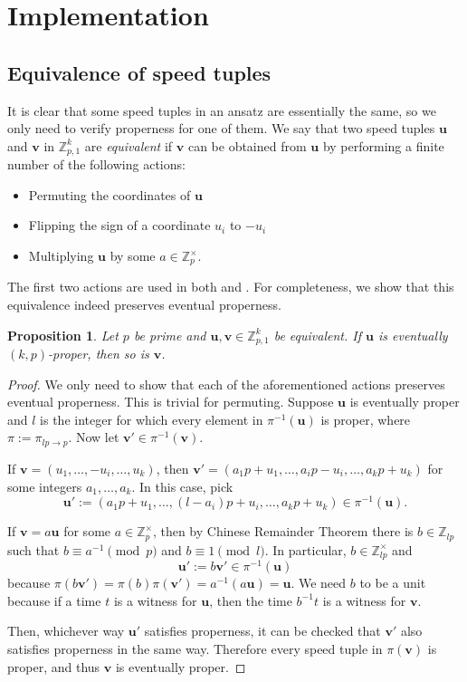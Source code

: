 \documentclass[11pt]{amsart}
\newcommand{\Unit}[1]{\Z_{#1}^\times}
\newcommand{\Z}{\mathbb{Z}}
\newcommand{\vbf}{\mathbf{v}}
\newcommand{\ubf}{\mathbf{u}}
\newtheorem{proposition}[theorem]{Proposition}
\theoremstyle{definition}
\theoremstyle{remark}
\begin{document}
\section{Implementation}
\label{sec:algo}

\subsection{Equivalence of speed tuples}
\label{subsec:equiv}
It is clear that some speed tuples in an ansatz are essentially the same, so we only need to verify properness for one of them.
We say that two speed tuples $\ubf$ and $\vbf$ in $\Z_{p,1}^k$ are \emph{equivalent} if $\vbf$ can be obtained from $\ubf$ 
by performing a finite number of the following actions:
\begin{itemize}
    \item Permuting the coordinates of $\ubf$
    \item Flipping the sign of a coordinate $u_i$ to $-u_i$
    \item Multiplying $\ubf$ by some $a\in\Unit{p}$.
\end{itemize}

The first two actions are used in both \cite{Rosenfeld} and \cite{Trakulthongchai}.
For completeness, we show that this equivalence indeed preserves eventual properness.

\begin{proposition}
  \label{prop:equivproper}
  Let $p$ be prime and $\ubf,\vbf\in\Z_{p,1}^k$ be equivalent.
  If $\ubf$ is eventually $(k,p)$-proper, then so is $\vbf$.
\end{proposition}
\begin{proof}
  We only need to show that each of the aforementioned actions preserves eventual properness.
  This is trivial for permuting.
  Suppose $\ubf$ is eventually proper and $l$ is the integer for which every element in $\pi^{-1}(\ubf)$ is proper,
  where $\pi:=\pi_{lp\rightarrow p}$. Now let $\vbf'\in \pi^{-1}(\vbf)$.

  If $\vbf=(u_1,\ldots,-u_i,\ldots,u_k)$, 
  then $\vbf'=(a_1p+u_1,\ldots,a_ip-u_i,\ldots,a_kp+u_k)$ for some integers $a_1,\ldots,a_k$. 
  In this case, pick 
  \[\ubf':=(a_1p+u_1,\ldots,(l-a_i)p+u_i,\ldots,a_kp+u_k)\in\pi^{-1}(\ubf).\]

  If $\vbf=a\ubf$ for some $a\in\Unit{p}$, 
  then by Chinese Remainder Theorem there is $b\in\Z_{lp}$ such that $b\equiv a^{-1} \pmod{p}$ and $b\equiv1\pmod{l}$. 
  In particular, $b\in\Unit{lp}$ and 
  \[\ubf':=b\vbf'\in\pi^{-1}(\ubf)\]
  because $\pi(b\vbf')=\pi(b)\pi(\vbf')=a^{-1}(a\ubf)=\ubf$. We need $b$ to be a unit because if a time $t$ is a witness for $\ubf$, then the time $b^{-1}t$ is a witness for $\vbf$.

  Then, whichever way $\ubf'$ satisfies properness,
  it can be checked that $\vbf'$ also satisfies properness in the same way.
  Therefore every speed tuple in $\pi(\vbf)$ is proper, and thus $\vbf$ is eventually proper.
\end{proof}
\end{document}
